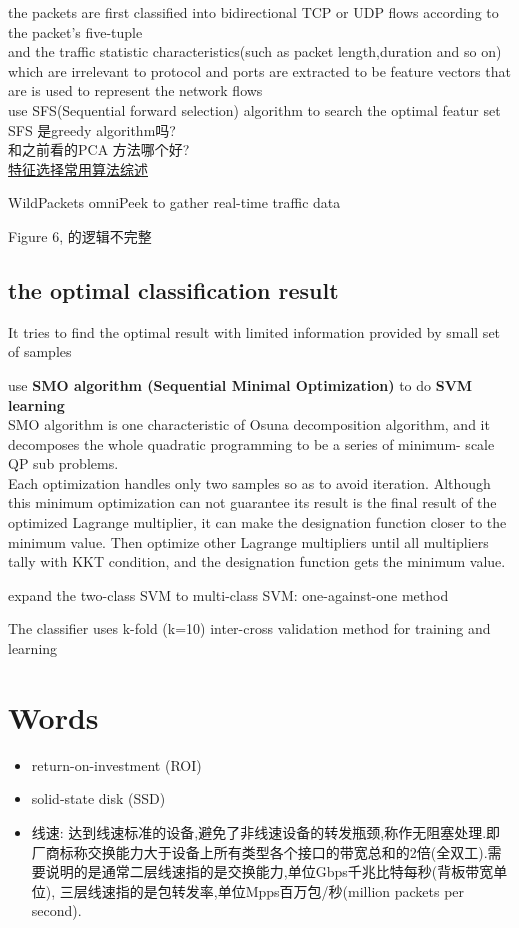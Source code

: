 \documentclass{article}
\begin{document}
the packets are first classified into bidirectional TCP or UDP flows according to the packet's five-tuple\\
and the traffic statistic characteristics(such as packet length,duration and so on) which are irrelevant to protocol and ports are extracted to be feature vectors that are is used to represent the network flows\\
use SFS(Sequential forward selection) algorithm to search the optimal featur set\\
SFS 是greedy algorithm吗?\\
和之前看的PCA 方法哪个好?\\
\href{http://www.cnblogs.com/heaad/archive/2011/01/02/1924088.html}{特征选择常用算法综述}

WildPackets omniPeek to gather real-time traffic data

Figure 6, 的逻辑不完整

\subsection{the optimal classification result}\label{the-optimal-classification-result}
It tries to find the optimal result with limited information provided by small set of samples

use \textbf{SMO algorithm (Sequential Minimal Optimization)} to do \textbf{SVM learning}\\
SMO algorithm is one characteristic of Osuna decomposition algorithm, and it decomposes the whole quadratic programming to be a series of minimum- scale QP sub problems.\\
Each optimization handles only two samples so as to avoid iteration. Although this minimum optimization can not guarantee its result is the final result of the optimized Lagrange multiplier, it can make the designation function closer to the minimum value. Then optimize other Lagrange multipliers until all multipliers tally with KKT condition, and the designation function gets the minimum value.

expand the two-class SVM to multi-class SVM: one-against-one method

The classifier uses k-fold (k=10) inter-cross validation method for training and learning

\section{Words}\label{words}
\begin{itemize}
\item return-on-investment (ROI)
\item solid-state disk (SSD)
\item 线速:
  达到线速标准的设备,避免了非线速设备的转发瓶颈,称作无阻塞处理.即厂商标称交换能力大于设备上所有类型各个接口的带宽总和的2倍(全双工).需要说明的是通常二层线速指的是交换能力,单位Gbps千兆比特每秒(背板带宽单位), 三层线速指的是包转发率,单位Mpps百万包/秒(million packets per second).
\end{itemize}
\end{document}
